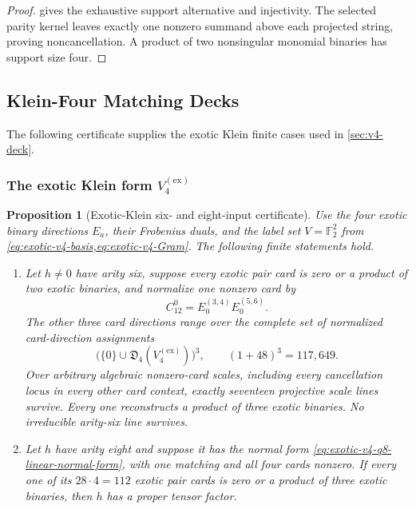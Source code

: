 \documentclass[11pt,letterpaper,onecolumn]{article}
\theoremstyle{plain}
\newtheorem{proposition}[proposition]{Proposition}
\theoremstyle{definition}
\theoremstyle{remark}
\newcommand{\Ftwo}{\mathbb F_2}
\newcommand{\KleinEx}{{V_4^{(\mathrm{ex})}}}
\begin{document}
\begin{proof}
 gives the exhaustive support
alternative and injectivity.  The selected parity kernel leaves exactly one
nonzero summand above each projected string, proving noncancellation.  A product
of two nonsingular monomial binaries has support size four.
\end{proof}

\subsection{Klein-Four Matching Decks}
\label{appsec:cert-klein-four}
\label{proofsubsec:extended-v4-certificates}

The following certificate supplies the exotic Klein finite cases used
in \cref{sec:v4-deck}.

\subsubsection{The exotic Klein form
  \texorpdfstring{\(\KleinEx\)}{V4 (ex)}}
\label{proofsubsec:cert-exotic-v4}

\begin{proposition}[Exotic-Klein six- and eight-input certificate]
\label{prop:cert-exotic-v4-q6-q8}
Use the four exotic binary directions \(E_a\), their Frobenius duals, and
the label set \(V=\Ftwo^2\) from
\cref{eq:exotic-v4-basis,eq:exotic-v4-Gram}.  The following finite
statements hold.
\begin{enumerate}[label=\textnormal{(\roman*)}]
\item Let \(h\ne0\) have arity six, suppose every exotic pair card is zero
      or a product of two exotic binaries, and normalize one nonzero card by
      \[
        C_{12}^0=E_0^{(3,4)}E_0^{(5,6)}.
      \]
      The other three card directions range over the complete set of normalized
      card-direction assignments
      \[
        \bigl(\{0\}\cup\mathfrak D_4(\KleinEx)\bigr)^3,
        \qquad (1+48)^3=117{,}649.
      \]
      Over arbitrary algebraic nonzero-card scales, including every
      cancellation locus in every other card context, exactly seventeen
      projective scale lines survive.  Every one reconstructs a product of
      three exotic binaries. No irreducible arity-six line survives.
\item Let \(h\) have arity eight and suppose it has the normal form \cref{eq:exotic-v4-q8-linear-normal-form}, with one matching and
all four cards nonzero.  If every one of its
      \(28\cdot4=112\) exotic pair cards is zero or a product of three
      exotic binaries, then \(h\) has a proper tensor factor.
      \end{enumerate}
\end{proposition}
\end{document}
